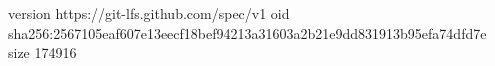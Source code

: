 version https://git-lfs.github.com/spec/v1
oid sha256:2567105eaf607e13eecf18bef94213a31603a2b21e9dd831913b95efa74dfd7e
size 174916
